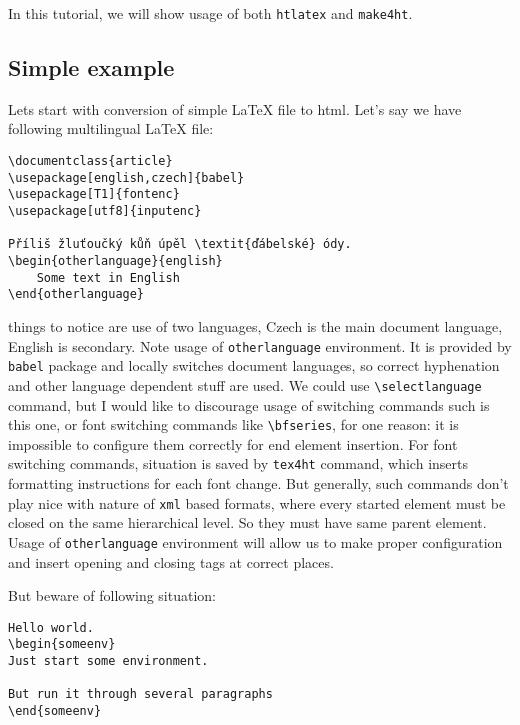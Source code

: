In this tutorial, we will show usage of both \texttt{htlatex} and
\texttt{make4ht}.

\hypertarget{simple-example}{%
\subsection{Simple example}\label{simple-example}}

Lets start with conversion of simple LaTeX file to html. Let's say we
have following multilingual LaTeX file:

\begin{verbatim}
\documentclass{article}
\usepackage[english,czech]{babel}
\usepackage[T1]{fontenc}
\usepackage[utf8]{inputenc}

Příliš žluťoučký kůň úpěl \textit{ďábelské} ódy.
\begin{otherlanguage}{english}
    Some text in English
\end{otherlanguage}

\end{verbatim}

things to notice are use of two languages, Czech is the main document
language, English is secondary. Note usage of \texttt{otherlanguage}
environment. It is provided by \texttt{babel} package and locally
switches document languages, so correct hyphenation and other language
dependent stuff are used. We could use
\texttt{\textbackslash{}selectlanguage} command, but I would like to
discourage usage of switching commands such is this one, or font
switching commands like \texttt{\textbackslash{}bfseries}, for one
reason: it is impossible to configure them correctly for end element
insertion. For font switching commands, situation is saved by
\texttt{tex4ht} command, which inserts formatting instructions for each
font change. But generally, such commands don't play nice with nature of
\texttt{xml} based formats, where every started element must be closed
on the same hierarchical level. So they must have same parent element.
Usage of \texttt{otherlanguage} environment will allow us to make proper
configuration and insert opening and closing tags at correct places.

But beware of following situation:

\begin{verbatim}
Hello world.
\begin{someenv}
Just start some environment.

But run it through several paragraphs
\end{someenv}
\end{verbatim}


